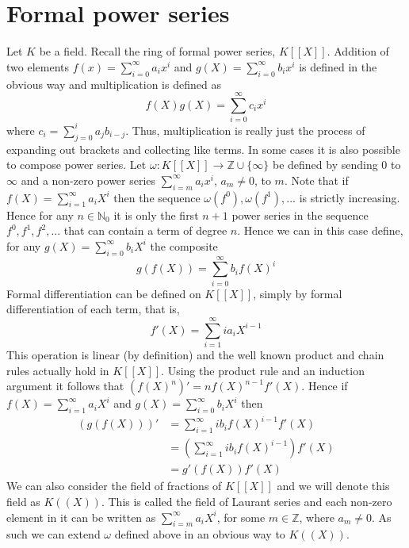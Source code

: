 \documentclass{article}
\newcommand{\mbb}[1]{\mathbb{#1}}
\numberwithin{equation}{section}
\begin{document}
\section{Formal power series}\label{sec: Formal power series}

Let $K$ be a field. Recall the ring of formal power series, $K[[X]]$. Addition of two elements $f(x) = \sum_{i = 0}^\infty a_ix^i$ and $g(X) = \sum_{i = 0}^\infty b_ix^i$ is defined in the obvious way and multiplication is defined as
$$f(X)g(X) = \sum_{i = 0}^{\infty}c_i x^i$$
where $c_i = \sum_{j = 0}^i a_j b_{i-j}$. Thus, multiplication is really just the process of expanding out brackets and collecting like terms. In some cases it is also possible to compose power series. Let $\omega : K[[X]] \to \mbb Z \cup \{\infty \}$ be defined by sending $0$ to $\infty$ and a non-zero power series $\sum_{i = m}^\infty a_i x^i$, $a_m \neq 0$, to $m$. Note that if $f(X) = \sum_{i = 1}^\infty a_iX^i$ then the sequence $\omega(f^0), \omega(f^1), ...$ is strictly increasing. Hence for any $n \in \mbb N_0$ it is only the first $n+1$ power series in the sequence $f^0, f^1, f^2, ...$ that can contain a term of degree $n$.  
Hence we can in this case define, for any $g(X) = \sum_{i = 0}^\infty b_i X^i$ the composite
$$g(f(X)) = \sum_{i = 0}^\infty b_i f(X)^i$$
Formal differentiation can be defined on $K[[X]]$, simply by formal differentiation of each term, that is,
$$f'(X) = \sum_{i = 1}^\infty i a_{i} X^{i-1}$$
This operation is linear (by definition) and the well known product and chain rules actually hold in $K[[X]]$. Using the product rule and an induction argument it follows that $(f(X)^n)' = n f(X)^{n-1}f'(X)$. Hence if $f(X) = \sum_{i = 1}^\infty a_i X^i$ and $g(X) = \sum_{i = 0}^\infty b_i X^i$ then
\begin{align*}
    (g(f(X)))' &= \sum_{i = 1}^\infty ib_i f(X)^{i-1}f'(X)\\
    &= (\sum_{i = 1}^\infty i b_i f(X)^{i-1})f'(X) \\
    &= g'(f(X))f'(X)
\end{align*}
We can also consider the field of fractions of $K[[X]]$ and we will denote this field as $K((X))$. This is called the field of Laurant series and each non-zero element in it can be written as $\sum_{i = m}^\infty a_i X^i$, for some $m \in \mbb Z$, where $a_m \neq 0$. As such we can extend $\omega$ defined above in an obvious way to $K((X))$.
\end{document}
